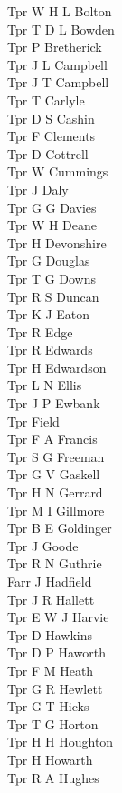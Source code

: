 \begin{multicols}{3}
  Tpr W H L Bolton \\
  Tpr T D L Bowden \\
  Tpr P Bretherick \\
  Tpr J L Campbell \\
  Tpr J T Campbell \\
  Tpr T Carlyle \\
  Tpr D S Cashin \\
  Tpr F Clements \\
  Tpr D Cottrell \\
  Tpr W Cummings \\
  Tpr J Daly \\
  Tpr G G Davies \\
  Tpr W H Deane \\
  Tpr H Devonshire \\
  Tpr G Douglas \\
  Tpr T G Downs \\
  Tpr R S Duncan \\
  Tpr K J Eaton \\
  Tpr R Edge \\
  Tpr R Edwards \\
  Tpr H Edwardson \\
  Tpr L N Ellis \\
  Tpr J P Ewbank \\
  Tpr Field \\
  Tpr F A Francis \\
  Tpr S G Freeman \\
  Tpr G V Gaskell \\
  Tpr H N Gerrard \\
  Tpr M I Gillmore \\
  Tpr B E Goldinger \\
  Tpr J Goode \\
  Tpr R N Guthrie \\
  Farr J Hadfield \\
  Tpr J R Hallett \\
  Tpr E W J Harvie \\
  Tpr D Hawkins \\
  Tpr D P Haworth \\
  Tpr F M Heath \\
  Tpr G R Hewlett \\
  Tpr G T Hicks \\
  Tpr T G Horton \\
  Tpr H H Houghton \\
  Tpr H Howarth \\
  Tpr R A Hughes \\

\end{multicols}
